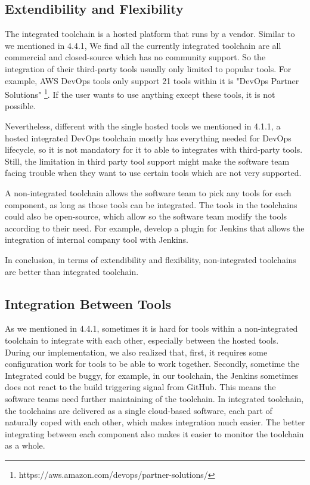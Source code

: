 \subsection{Extendibility and Flexibility}
The integrated toolchain is a hosted platform that runs by a vendor. Similar to we mentioned in 4.4.1, We find all the currently integrated toolchain are all commercial and closed-source which has no community support. So the integration of their third-party tools usually only limited to popular tools. For example, AWS DevOps tools only support 21 tools within it is "DevOps Partner Solutions" \footnote{https://aws.amazon.com/devops/partner-solutions/}. If the user wants to use anything except these tools, it is not possible.
\par
Nevertheless, different with the single hosted tools we mentioned in 4.1.1, a hosted integrated DevOps toolchain mostly has everything needed for DevOps lifecycle, so it is not mandatory for it to able to integrates with third-party tools. Still, the limitation in third party tool support might make the software team facing trouble when they want to use certain tools which are not very supported.
\par
A non-integrated toolchain allows the software team to pick any tools for each component, as long as those tools can be integrated. The tools in the toolchains could also be open-source, which allow so the software team modify the tools according to their need. For example, develop a plugin for Jenkins that allows the integration of internal company tool with Jenkins.
\par
In conclusion, in terms of extendibility and flexibility, non-integrated toolchains are better than integrated toolchain.
\subsection{Integration Between Tools}
As we mentioned in 4.4.1, sometimes it is hard for tools within a non-integrated toolchain to integrate with each other, especially between the hosted tools. 
During our implementation, we also realized that, first, it requires some configuration work for tools to be able to work together. Secondly, sometime the Integrated could be buggy, for example, in our toolchain, the Jenkins sometimes does not react to the build triggering signal from GitHub. This means the software teams need further maintaining of the toolchain.
In integrated toolchain, the toolchains are delivered as a single cloud-based software, each part of naturally coped with each other, which makes integration much easier.
The better integrating between each component also makes it easier to monitor the toolchain as a whole.
